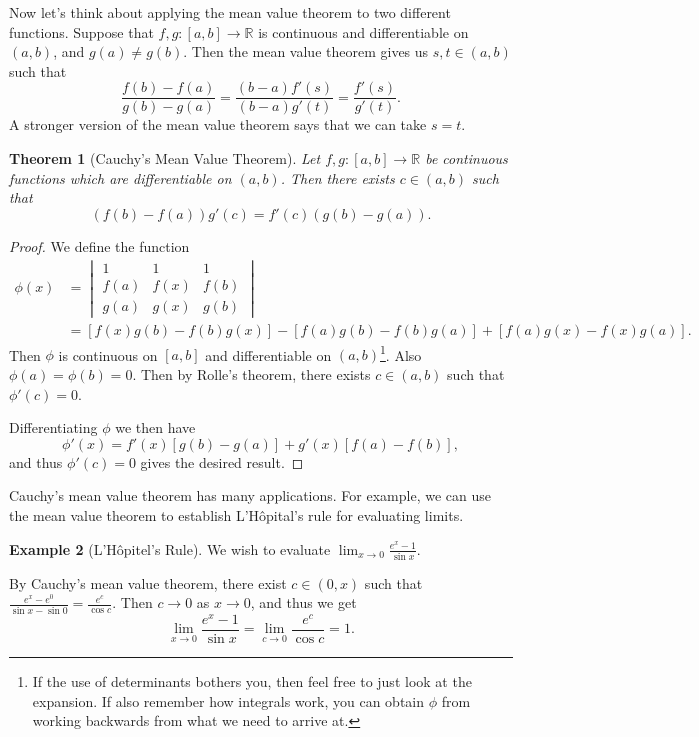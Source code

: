 \documentclass[11pt, a4paper]{article}
\newtheorem{theorem}{Theorem}[section]
\theoremstyle{definition}
\newtheorem{example}[theorem]{Example}
\newcommand{\R}{\mathbb{R}}
\begin{document}
Now let's think about applying the mean value theorem to two different functions. Suppose that $f, g : [a, b] \rightarrow \R$ is continuous and differentiable on $(a, b)$, and $g(a) \neq g(b)$. Then the mean value theorem gives us $s, t \in (a, b)$ such that
$$
	\frac{f(b) - f(a)}{g(b) - g(a)} = \frac{(b - a)f'(s)}{(b - a)g'(t)} = \frac{f'(s)}{g'(t)}.
$$
A stronger version of the mean value theorem says that we can take $s = t$.

\begin{theorem}[Cauchy's Mean Value Theorem]
	Let $f, g : [a, b] \rightarrow \R$ be continuous functions which are differentiable on $(a, b)$. Then there exists $c \in (a, b)$ such that
	$$
	(f(b) - f(a))g'(c) = f'(c)(g(b) - g(a)).
	$$
\end{theorem}
\begin{proof}
	We define the function
	\begin{align*}
		\phi(x) &= \begin{vmatrix}
			1 & 1 & 1 \\
			f(a) & f(x) & f(b) \\
			g(a) & g(x) & g(b)
			\end{vmatrix}  \\
		&= \left[f(x)g(b) - f(b)g(x)\right] - [f(a)g(b) - f(b) g(a)] + [f(a) g(x) - f(x) g(a)].
	\end{align*}
	Then $\phi$ is continuous on $[a, b]$ and differentiable on $(a, b)$\footnote{If the use of determinants bothers you, then feel free to just look at the expansion. If also remember how integrals work, you can obtain $\phi$ from working backwards from what we need to arrive at.}. Also $\phi(a) =\phi(b) = 0$. Then by Rolle's theorem, there exists $c \in (a, b)$ such that $\phi'(c) = 0$.
	
	Differentiating $\phi$ we then have 
	$$
	\phi'(x) = f'(x)[g(b) - g(a)] + g'(x)[f(a) - f(b)],
	$$
	and thus $\phi'(c) = 0$ gives the desired result.
\end{proof}

Cauchy's mean value theorem has many applications. For example, we can use the mean value theorem to establish L'Hôpital's rule for evaluating limits.

\begin{example}[L'Hôpitel's Rule]
	We wish to evaluate $\displaystyle \lim_{x \to 0} \frac{e^x - 1}{\sin x}$.

	By Cauchy's mean value theorem, there exist $c \in (0, x)$ such that
	$
	\frac{e^x - e^0}{\sin x - \sin 0} = \frac{e^c}{\cos c}.
	$
	Then $c \rightarrow 0$ as $x \rightarrow 0$, and thus we get
	$$
	\lim_{x \to 0} \frac{e^x - 1}{\sin x} = \lim_{c \to 0}\frac{e^c}{\cos c} = 1.
	$$
\end{example}
\end{document}
